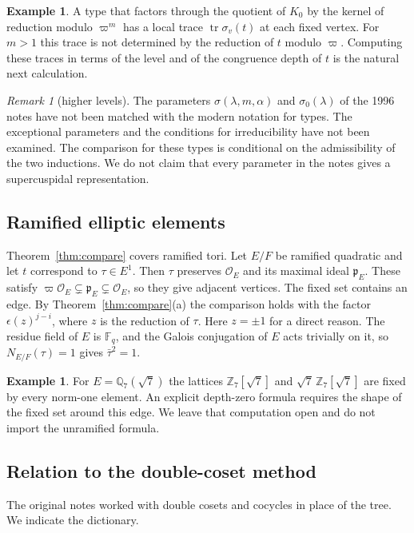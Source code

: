 \documentclass[12pt,letterpaper]{article}
\numberwithin{equation}{section}
\theoremstyle{definition}
\newtheorem{example}[theorem]{Example}
\theoremstyle{remark}
\newtheorem{remarkyr}{Remark}
\newcommand{\OEr}{\mathcal O_E}
\newcommand{\kk}{\mathbb F_q}
\newcommand{\tr}{\operatorname{tr}}
\newcommand{\sgn}{\epsilon}
\begin{document}
\begin{example}
A type that factors through the quotient of $K_0$ by the kernel of reduction modulo $\varpi^m$ has a local trace $\tr\sigma_v(t)$ at each fixed vertex. For $m>1$ this trace is not determined by the reduction of $t$ modulo $\varpi$. Computing these traces in terms of the level and of the congruence depth of $t$ is the natural next calculation.
\end{example}

\begin{remarkyr}[higher levels]\label{rem:levels}
The parameters $\sigma(\lambda,m,\alpha)$ and $\sigma_0(\lambda)$ of the 1996 notes have not been matched with the modern notation for types. The exceptional parameters and the conditions for irreducibility have not been examined. The comparison for these types is conditional on the admissibility of the two inductions. We do not claim that every parameter in the notes gives a supercuspidal representation.
\end{remarkyr}

\subsection*{Ramified elliptic elements}
Theorem~\ref{thm:compare} covers ramified tori. Let $E/F$ be ramified quadratic and let $t$ correspond to $\tau\in E^1$. Then $\tau$ preserves $\OEr$ and its maximal ideal $\mathfrak p_E$. These satisfy $\varpi\OEr\subsetneq\mathfrak p_E\subsetneq\OEr$, so they give adjacent vertices. The fixed set contains an edge. By Theorem~\ref{thm:compare}(a) the comparison holds with the factor $\sgn(z)^{j-i}$, where $z$ is the reduction of $\tau$. Here $z=\pm1$ for a direct reason. The residue field of $E$ is $\kk$, and the Galois conjugation of $E$ acts trivially on it, so $N_{E/F}(\tau)=1$ gives $\bar\tau^2=1$.

\begin{example}
For $E=\mathbb Q_7(\sqrt7)$ the lattices $\mathbb Z_7[\sqrt7]$ and $\sqrt7\,\mathbb Z_7[\sqrt7]$ are fixed by every norm-one element. An explicit depth-zero formula requires the shape of the fixed set around this edge. We leave that computation open and do not import the unramified formula.
\end{example}

\subsection*{Relation to the double-coset method}
The original notes worked with double cosets and cocycles in place of the tree. We indicate the dictionary.
\end{document}
